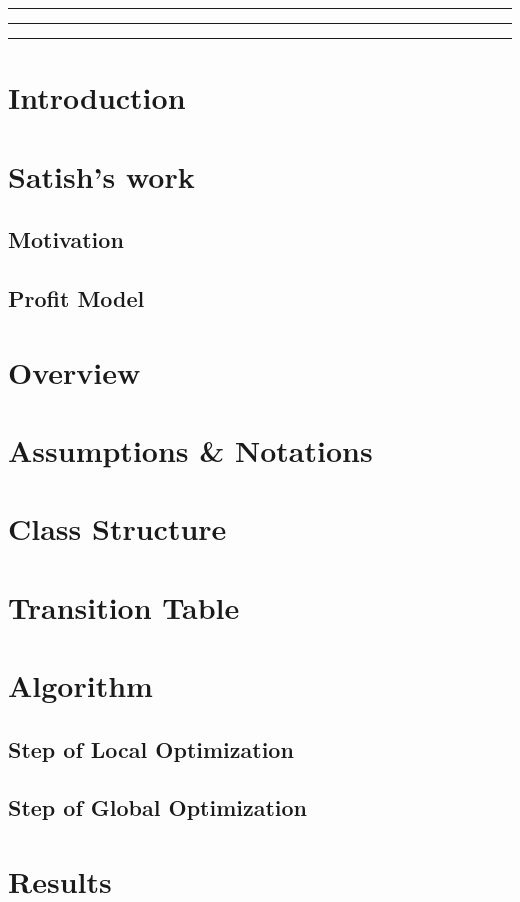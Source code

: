 \documentclass[a4paper,12pt]{article}
\begin{document}

\tableofcontents
\vspace{0.5cm}
\hrule \hrule \hrule
\newpage

\section{Introduction}

\section{Satish's work}
\subsection{Motivation}
\subsection{Profit Model}

\section{Overview}

\section{Assumptions \& Notations}

\section{Class Structure}

\section{Transition Table}

\section{Algorithm}
\subsection{Step of Local Optimization}
\subsection{Step of Global Optimization}

\section{Results}
\end{document}
